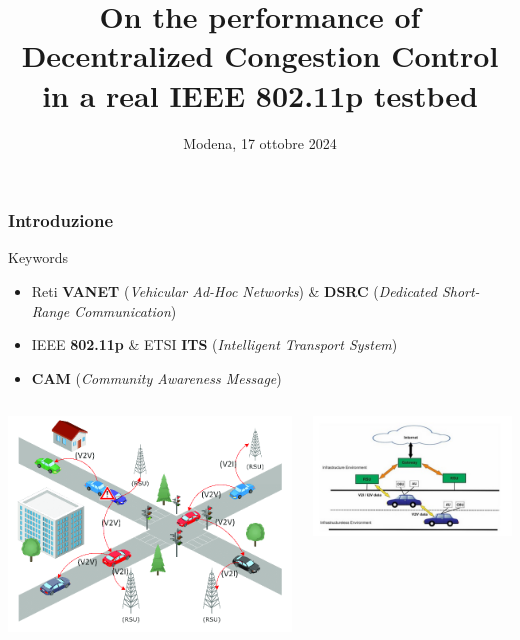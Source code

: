 \documentclass{beamer}
\title[DCC performance in IEEE 802.11p] %
{On the performance of Decentralized Congestion Control in a real IEEE 802.11p testbed}
\institute[] %
{
    \fontsize{11}{13}\selectfont \textbf{Relatore: Prof. Carlo Augusto Grazia}
    \and
    Esame di Automotive Connectivity\\
    Corso di Laurea Magistrale in Ingegneria Informatica\\
    Percorso "\textit{Cloud \& Cybersecurity}"
    \and
    Dipartimento di Ingegneria "Enzo Ferrari"\\
    Università degli studi di Modena e Reggio Emilia
}
\date[17 ottobre 2024] %
{Modena, 17 ottobre 2024}
\begin{document}
\frame{\titlepage}

\begin{frame}
    \frametitle{Introduzione}
    \centering
    \begin{block}{Keywords}
        \begin{itemize}
            \item Reti \textbf{VANET} (\textit{Vehicular Ad-Hoc Networks}) \& \textbf{DSRC} (\textit{Dedicated Short-Range Communication})
            \item IEEE \textbf{802.11p} \& ETSI \textbf{ITS} (\textit{Intelligent Transport System})
            \item \textbf{CAM} (\textit{Community Awareness Message})
        \end{itemize}
    \end{block}
    
    \begin{columns}
        \begin{column}{0.5\textwidth}
            \centering
            \includegraphics[width=1\textwidth]{vanet.png}
            \label{fig:vanet}
        \end{column}
        \begin{column}{0.5\textwidth}
            \centering
            \includegraphics[width=1\textwidth]{routing_vanet.jpeg}
            \label{fig:obu_rsu}
        \end{column}
    \end{columns}
\end{frame}    
\end{document}
